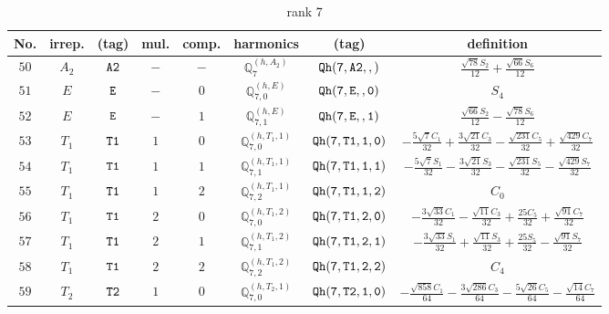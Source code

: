 \documentclass[fleqn,8pt]{jsarticle}
\begin{document}
\begin{table}[ht!]
\begin{center}
\caption{rank 7}
\renewcommand{\arraystretch}{1.3}
\begin{tabular}{cccccccc} \hline \hline
No. & irrep. & (tag) & mul. & comp. & harmonics & (tag) & definition \\ \hline
$ 50 $ & $ A_{2} $ & $ {\tt A2} $ & $ - $ & $ - $ & $ \mathbb{Q}_{7}^{(h,A_{2})} $ & $ {\tt Qh(7,A2,,)} $ & $ \frac{\sqrt{78} S_{2}}{12} + \frac{\sqrt{66} S_{6}}{12} $ \\
$ 51 $ & $ E $ & $ {\tt E} $ & $ - $ & $ 0 $ & $ \mathbb{Q}_{7,0}^{(h,E)} $ & $ {\tt Qh(7,E,,0)} $ & $ S_{4} $ \\
$ 52 $ & $ E $ & $ {\tt E} $ & $ - $ & $ 1 $ & $ \mathbb{Q}_{7,1}^{(h,E)} $ & $ {\tt Qh(7,E,,1)} $ & $ \frac{\sqrt{66} S_{2}}{12} - \frac{\sqrt{78} S_{6}}{12} $ \\
$ 53 $ & $ T_{1} $ & $ {\tt T1} $ & $ 1 $ & $ 0 $ & $ \mathbb{Q}_{7,0}^{(h,T_{1},1)} $ & $ {\tt Qh(7,T1,1,0)} $ & $ - \frac{5 \sqrt{7} C_{1}}{32} + \frac{3 \sqrt{21} C_{3}}{32} - \frac{\sqrt{231} C_{5}}{32} + \frac{\sqrt{429} C_{7}}{32} $ \\
$ 54 $ & $ T_{1} $ & $ {\tt T1} $ & $ 1 $ & $ 1 $ & $ \mathbb{Q}_{7,1}^{(h,T_{1},1)} $ & $ {\tt Qh(7,T1,1,1)} $ & $ - \frac{5 \sqrt{7} S_{1}}{32} - \frac{3 \sqrt{21} S_{3}}{32} - \frac{\sqrt{231} S_{5}}{32} - \frac{\sqrt{429} S_{7}}{32} $ \\
$ 55 $ & $ T_{1} $ & $ {\tt T1} $ & $ 1 $ & $ 2 $ & $ \mathbb{Q}_{7,2}^{(h,T_{1},1)} $ & $ {\tt Qh(7,T1,1,2)} $ & $ C_{0} $ \\
$ 56 $ & $ T_{1} $ & $ {\tt T1} $ & $ 2 $ & $ 0 $ & $ \mathbb{Q}_{7,0}^{(h,T_{1},2)} $ & $ {\tt Qh(7,T1,2,0)} $ & $ - \frac{3 \sqrt{33} C_{1}}{32} - \frac{\sqrt{11} C_{3}}{32} + \frac{25 C_{5}}{32} + \frac{\sqrt{91} C_{7}}{32} $ \\
$ 57 $ & $ T_{1} $ & $ {\tt T1} $ & $ 2 $ & $ 1 $ & $ \mathbb{Q}_{7,1}^{(h,T_{1},2)} $ & $ {\tt Qh(7,T1,2,1)} $ & $ - \frac{3 \sqrt{33} S_{1}}{32} + \frac{\sqrt{11} S_{3}}{32} + \frac{25 S_{5}}{32} - \frac{\sqrt{91} S_{7}}{32} $ \\
$ 58 $ & $ T_{1} $ & $ {\tt T1} $ & $ 2 $ & $ 2 $ & $ \mathbb{Q}_{7,2}^{(h,T_{1},2)} $ & $ {\tt Qh(7,T1,2,2)} $ & $ C_{4} $ \\
$ 59 $ & $ T_{2} $ & $ {\tt T2} $ & $ 1 $ & $ 0 $ & $ \mathbb{Q}_{7,0}^{(h,T_{2},1)} $ & $ {\tt Qh(7,T2,1,0)} $ & $ - \frac{\sqrt{858} C_{1}}{64} - \frac{3 \sqrt{286} C_{3}}{64} - \frac{5 \sqrt{26} C_{5}}{64} - \frac{\sqrt{14} C_{7}}{64} $ \\

\end{tabular}
\end{center}
\end{table}
\end{document}
